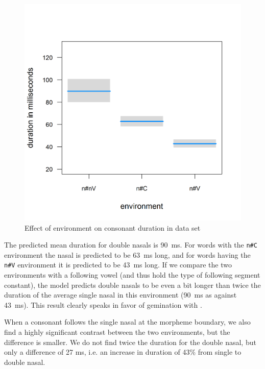 \begin{figure} []
	\centering
	\includegraphics [scale=0.4] {images/Corpus/unModelNumNasal.png}
	\caption{Effect of environment on consonant duration in data set}
	\label{fig:NumNasal un}
\end{figure}


\clearpage

The predicted mean duration for double nasals is 90~ms. For words with the \texttt{n\#C} environment the nasal is predicted to be 63~ms long, and for words having the \texttt{n\#V} environment it is predicted to be 43~ms long. If we compare the two environments with a following vowel (and thus hold the type of following segment constant), the model predicts double nasals to be even a bit longer than twice the duration of the average single nasal in this environment (90~ms as against 43~ms). This result clearly speaks in favor of gemination with .

When a consonant follows the single nasal at the morpheme boundary, we also find a highly significant contrast between the two environments, but the difference is smaller. We do not find twice the duration for the double nasal, but only a difference of 27 ms, i.e. an increase in duration of 43\% from single to double nasal. 

